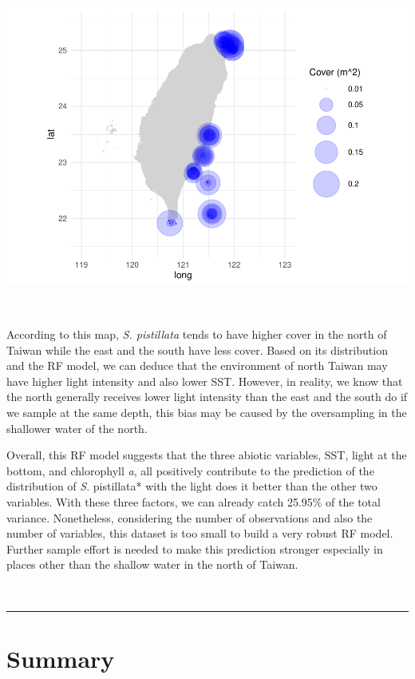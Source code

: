 \documentclass[
]{article}
\begin{document}
\includegraphics{index_files/figure-latex/unnamed-chunk-13-1.pdf}

~

According to this map, \emph{S. pistillata} tends to have higher cover
in the north of Taiwan while the east and the south have less cover.
Based on its distribution and the RF model, we can deduce that the
environment of north Taiwan may have higher light intensity and also
lower SST. However, in reality, we know that the north generally
receives lower light intensity than the east and the south do if we
sample at the same depth, this bias may be caused by the oversampling in
the shallower water of the north.

Overall, this RF model suggests that the three abiotic variables, SST,
light at the bottom, and chlorophyll \emph{a}, all positively contribute
to the prediction of the distribution of \emph{S}. pistillata* with the
light does it better than the other two variables. With these three
factors, we can already catch 25.95\% of the total variance.
Nonetheless, considering the number of observations and also the number
of variables, this dataset is too small to build a very robust RF model.
Further sample effort is needed to make this prediction stronger
especially in places other than the shallow water in the north of
Taiwan.

~

\begin{center}\rule{0.5\linewidth}{0.5pt}\end{center}

\hypertarget{summary}{%
\section{Summary}\label{summary}}
\end{document}

